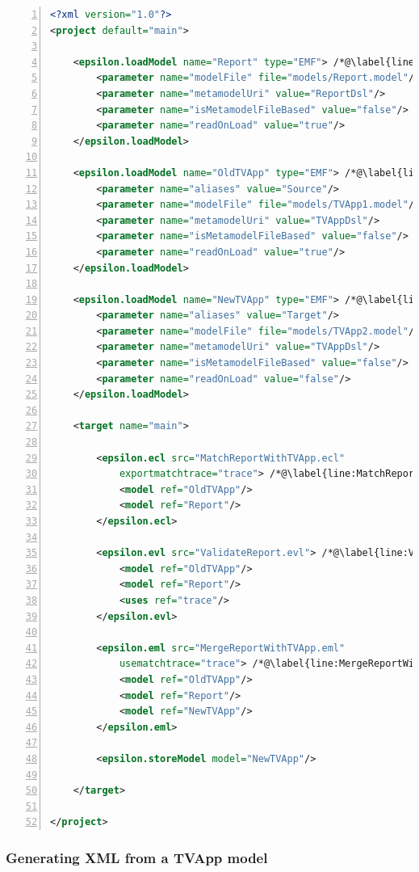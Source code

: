 \begin{lstlisting}[basicstyle=\ttfamily\footnotesize, flexiblecolumns=true, numbers=left, nolol=true, caption=Workflow integrating the comparison\, validation and merging steps, label=lst:CaseStudyMergingWorkflow, language=XML, tabsize=2]
<?xml version="1.0"?>
<project default="main">
	
	<epsilon.loadModel name="Report" type="EMF"> /*@\label{line:LoadReportTask}@*/
		<parameter name="modelFile" file="models/Report.model"/>
		<parameter name="metamodelUri" value="ReportDsl"/>
		<parameter name="isMetamodelFileBased" value="false"/>
		<parameter name="readOnLoad" value="true"/>
	</epsilon.loadModel>
	
	<epsilon.loadModel name="OldTVApp" type="EMF"> /*@\label{line:LoadOldTVAppTask}@*/
		<parameter name="aliases" value="Source"/>
		<parameter name="modelFile" file="models/TVApp1.model"/>
		<parameter name="metamodelUri" value="TVAppDsl"/>
		<parameter name="isMetamodelFileBased" value="false"/>
		<parameter name="readOnLoad" value="true"/>
	</epsilon.loadModel>	
	
	<epsilon.loadModel name="NewTVApp" type="EMF"> /*@\label{line:LoadNewTVAppTask}@*/
		<parameter name="aliases" value="Target"/>
		<parameter name="modelFile" file="models/TVApp2.model"/>
		<parameter name="metamodelUri" value="TVAppDsl"/>
		<parameter name="isMetamodelFileBased" value="false"/>
		<parameter name="readOnLoad" value="false"/>
	</epsilon.loadModel>

	<target name="main">
		
		<epsilon.ecl src="MatchReportWithTVApp.ecl" 
			exportmatchtrace="trace"> /*@\label{line:MatchReportWithTVAppTask}@*/
			<model ref="OldTVApp"/>
			<model ref="Report"/>
		</epsilon.ecl>
		
		<epsilon.evl src="ValidateReport.evl"> /*@\label{line:ValidateReportTask}@*/
			<model ref="OldTVApp"/>
			<model ref="Report"/>
			<uses ref="trace"/>
		</epsilon.evl>
		
		<epsilon.eml src="MergeReportWithTVApp.eml" 
			usematchtrace="trace"> /*@\label{line:MergeReportWithTVAppTask}@*/
			<model ref="OldTVApp"/>
			<model ref="Report"/>
			<model ref="NewTVApp"/>
		</epsilon.eml>
		
		<epsilon.storeModel model="NewTVApp"/>
		
	</target>
	
</project>
\end{lstlisting}

\subsubsection{Generating XML from a TVApp model}
\label{sec:GeneratingXML}

